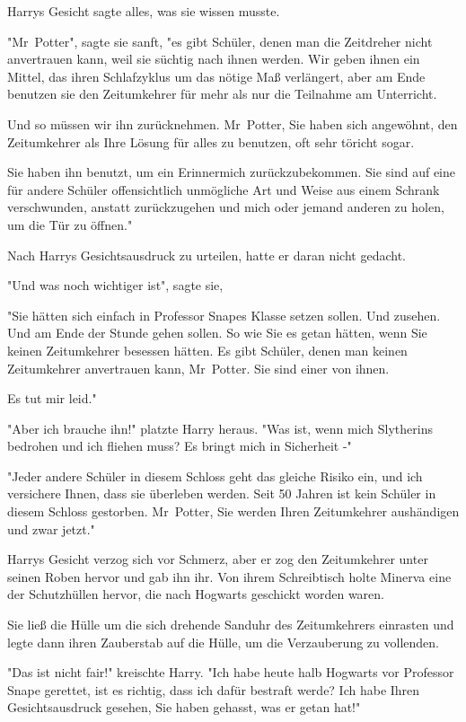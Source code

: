 {Harrys Gesicht sagte alles, was sie wissen musste.

"Mr~Potter", sagte sie sanft, "es gibt Schüler, denen man die Zeitdreher nicht anvertrauen kann, weil sie süchtig nach ihnen werden. Wir geben ihnen ein Mittel, das ihren Schlafzyklus um das nötige Maß verlängert, aber am Ende benutzen sie den Zeitumkehrer für mehr als nur die Teilnahme am Unterricht.

Und so müssen wir ihn zurücknehmen. Mr~Potter, Sie haben sich angewöhnt, den Zeitumkehrer als Ihre Lösung für alles zu benutzen, oft sehr töricht sogar.

Sie haben ihn benutzt, um ein Erinnermich zurückzubekommen. Sie sind auf eine für andere Schüler offensichtlich unmögliche Art und Weise aus einem Schrank verschwunden, anstatt zurückzugehen und mich oder jemand anderen zu holen, um die Tür zu öffnen."

Nach Harrys Gesichtsausdruck zu urteilen, hatte er daran nicht gedacht.

"Und was noch wichtiger ist", sagte sie,

"Sie hätten sich einfach in Professor Snapes Klasse setzen sollen. Und zusehen. Und am Ende der Stunde gehen sollen. So wie Sie es getan hätten, wenn Sie keinen Zeitumkehrer besessen hätten. Es gibt Schüler, denen man keinen Zeitumkehrer anvertrauen kann, Mr~Potter. Sie sind einer von ihnen.

Es tut mir leid."

"Aber ich brauche ihn!" platzte Harry heraus. "Was ist, wenn mich Slytherins bedrohen und ich fliehen muss? Es bringt mich in Sicherheit -"

"Jeder andere Schüler in diesem Schloss geht das gleiche Risiko ein, und ich versichere Ihnen, dass sie überleben werden. Seit 50 Jahren ist kein Schüler in diesem Schloss gestorben. Mr~Potter, Sie werden Ihren Zeitumkehrer aushändigen und zwar jetzt."

Harrys Gesicht verzog sich vor Schmerz, aber er zog den Zeitumkehrer unter seinen Roben hervor und gab ihn ihr. Von ihrem Schreibtisch holte Minerva eine der Schutzhüllen hervor, die nach Hogwarts geschickt worden waren.

Sie ließ die Hülle um die sich drehende Sanduhr des Zeitumkehrers einrasten und legte dann ihren Zauberstab auf die Hülle, um die Verzauberung zu vollenden.

"Das ist nicht fair!" kreischte Harry. "Ich habe heute halb Hogwarts vor Professor Snape gerettet, ist es richtig, dass ich dafür bestraft werde? Ich habe Ihren Gesichtsausdruck gesehen, Sie haben gehasst, was er getan hat!"

}

